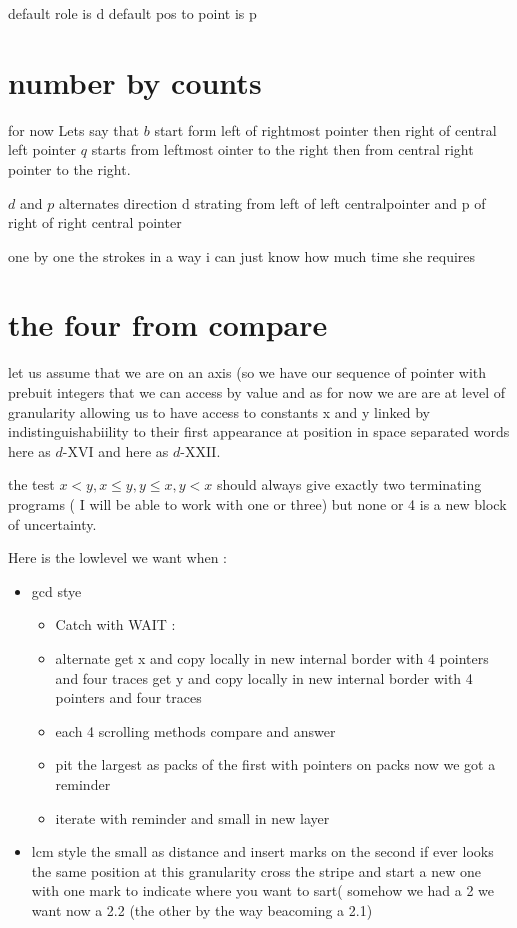 \documentclass{article}
\begin{document}
 default role is d default pos to point is p
 
 \section{number by counts}
 for now 
 Lets say that $b$ start form left of rightmost pointer then right of central left pointer
 $q$ starts from leftmost ointer to the right then from central right pointer to the right. 
 
 $d$ and $p$ alternates direction d strating from left of left  centralpointer and p of right of right central pointer
 
  one by one the strokes in a way i can just know how much time she requires  
  \section{ the four from compare }
  let us assume that we are on an axis (so we have our  sequence of pointer with prebuit integers that we can access by value 
  and as for now we are are at level of granularity allowing us to have access to constants  x and y linked by indistinguishabiility to their first appearance
  at position in space separated words here as $d$-XVI and here as $d$-XXII.
  
  the test $x<y,x\le y,y\le x, y<x$  should always give exactly two terminating programs ( I will be able to work with one or three)  but none or 4 is a new block of uncertainty.  
  
  
  Here is the lowlevel we want  when :
  \begin{itemize}

\item   gcd stye
  \begin{itemize}
  \item Catch with WAIT :
  
\item  alternate
\subitem  get x and copy locally in new internal border with 4 pointers and four traces
\subitem   get y and copy locally in new internal border with 4 pointers and four traces  
\item   each 4 scrolling methods compare and answer 
 \item    pit the largest as packs of the first with pointers on packs  now we got a reminder 
  \item  iterate with reminder and small in new layer 
  \end {itemize}
  \item lcm style
  \subitem  the small as distance and insert marks on the second if ever looks the same position at this granularity cross the stripe and start a new one with one mark to indicate where you want to sart( somehow we had a 2 we want now a 2.2 (the other by the way beacoming a 2.1)
   
  \end{itemize} 
  
\end{document}
